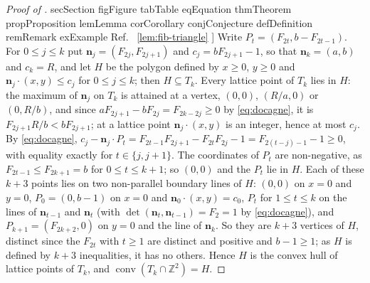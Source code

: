 \documentclass[11pt,a4paper]{article}
\makeatletter
\def\Cref@getprefix#1:#2\relax{#1}
\def\Cref@prefix@sec{sec}
\def\Cref@prefix@fig{fig}
\def\Cref@prefix@tab{tab}
\def\Cref@prefix@eq{eq}
\def\Cref@prefix@thm{thm}
\def\Cref@prefix@prop{prop}
\def\Cref@prefix@lem{lem}
\def\Cref@prefix@cor{cor}
\def\Cref@prefix@conj{conj}
\def\Cref@prefix@def{def}
\def\Cref@prefix@rem{rem}
\def\Cref@prefix@ex{ex}
\def\Cref@type@cap#1{%
  \edef\Cref@tmp{#1}%
  \ifx\Cref@tmp\Cref@prefix@sec Section%
  \else\ifx\Cref@tmp\Cref@prefix@fig Figure%
  \else\ifx\Cref@tmp\Cref@prefix@tab Table%
  \else\ifx\Cref@tmp\Cref@prefix@eq Equation%
  \else\ifx\Cref@tmp\Cref@prefix@thm Theorem%
  \else\ifx\Cref@tmp\Cref@prefix@prop Proposition%
  \else\ifx\Cref@tmp\Cref@prefix@lem Lemma%
  \else\ifx\Cref@tmp\Cref@prefix@cor Corollary%
  \else\ifx\Cref@tmp\Cref@prefix@conj Conjecture%
  \else\ifx\Cref@tmp\Cref@prefix@def Definition%
  \else\ifx\Cref@tmp\Cref@prefix@rem Remark%
  \else\ifx\Cref@tmp\Cref@prefix@ex Example%
  \else Ref.%
  \fi\fi\fi\fi\fi\fi\fi\fi\fi\fi\fi\fi
}
\DeclareRobustCommand{\Cref}[1]{%
  \begingroup
  \edef\Cref@label{#1}%
  \edef\Cref@prefix{\expandafter\Cref@getprefix\Cref@label:\relax}%
  \hyperref[#1]{\Cref@type@cap{\Cref@prefix}~\ref*{#1}}%
  \endgroup
}
\theoremstyle{plain}
\theoremstyle{definition}
\theoremstyle{remark}
\newcommand{\Z}{\mathbb{Z}}
\makeatother
\begin{document}
\begin{proof}[Proof of \Cref{lem:fib-triangle}]
Write $P_t=(F_{2t},b-F_{2t-1})$.
For $0\le j\le k$ put $\mathbf n_j=(F_{2j},F_{2j+1})$ and $c_j=bF_{2j+1}-1$, so that $\mathbf n_k=(a,b)$ and $c_k=R$, and let $H$ be the polygon defined by $x\ge0$, $y\ge0$ and $\mathbf n_j\cdot(x,y)\le c_j$ for $0\le j\le k$; then $H\subseteq T_k$.
Every lattice point of $T_k$ lies in $H$: the maximum of $\mathbf n_j$ on $T_k$ is attained at a vertex, $(0,0)$, $(R/a,0)$ or $(0,R/b)$, and since $aF_{2j+1}-bF_{2j}=F_{2k-2j}\ge0$ by \eqref{eq:docagne}, it is $F_{2j+1}R/b<bF_{2j+1}$; at a lattice point $\mathbf n_j\cdot(x,y)$ is an integer, hence at most $c_j$.
By \eqref{eq:docagne}, $c_j-\mathbf n_j\cdot P_t=F_{2t-1}F_{2j+1}-F_{2t}F_{2j}-1=F_{2(t-j)-1}-1\ge0$, with equality exactly for $t\in\{j,j+1\}$.
The coordinates of $P_t$ are non-negative, as $F_{2t-1}\le F_{2k+1}=b$ for $0\le t\le k+1$; so $(0,0)$ and the $P_t$ lie in $H$.
Each of these $k+3$ points lies on two non-parallel boundary lines of $H$: $(0,0)$ on $x=0$ and $y=0$, $P_0=(0,b-1)$ on $x=0$ and $\mathbf n_0\cdot(x,y)=c_0$, $P_t$ for $1\le t\le k$ on the lines of $\mathbf n_{t-1}$ and $\mathbf n_t$ (with $\det(\mathbf n_t,\mathbf n_{t-1})=F_2=1$ by \eqref{eq:docagne}), and $P_{k+1}=(F_{2k+2},0)$ on $y=0$ and the line of $\mathbf n_k$.
So they are $k+3$ vertices of $H$, distinct since the $F_{2t}$ with $t\ge1$ are distinct and positive and $b-1\ge1$; as $H$ is defined by $k+3$ inequalities, it has no others.
Hence $H$ is the convex hull of lattice points of $T_k$, and $\operatorname{conv}(T_k\cap\Z^2)=H$.
\end{proof}
\end{document}
